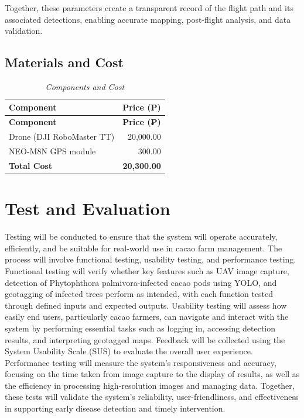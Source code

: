 Together, these parameters create a transparent record of the flight path and its associated detections, enabling accurate mapping, post-flight analysis, and data validation.

\subsection{Materials and Cost}

\begin{longtable}{p{8cm} r}
	\caption{\textit{Components and Cost}} \label{tab:components} \\

	\toprule
	\textbf{Component}        & \textbf{Price (₱)}                \\
	\midrule
	\endfirsthead

	\toprule
	\textbf{Component}        & \textbf{Price (₱)}                \\
	\midrule
	\endhead

	\bottomrule
	\endfoot

	Drone (DJI RoboMaster TT) & 20,000.00                         \\
	NEO-M8N GPS module        & 300.00                            \\
	\midrule
	\textbf{Total Cost}       & \textbf{20,300.00}                \\
\end{longtable}


\section{Test and Evaluation}

Testing will be conducted to ensure that the system will operate accurately, efficiently, and be suitable for real-world use in cacao farm management. The process will involve functional testing, usability testing, and performance testing. Functional testing will verify whether key features such as UAV image capture, detection of Phytophthora palmivora-infected cacao pods using YOLO, and geotagging of infected trees perform as intended, with each function tested through defined inputs and expected outputs. Usability testing will assess how easily end users, particularly cacao farmers, can navigate and interact with the system by performing essential tasks such as logging in, accessing detection results, and interpreting geotagged maps. Feedback will be collected using the System Usability Scale (SUS) to evaluate the overall user experience. Performance testing will measure the system’s responsiveness and accuracy, focusing on the time taken from image capture to the display of results, as well as the efficiency in processing high-resolution images and managing data. Together, these tests will validate the system’s reliability, user-friendliness, and effectiveness in supporting early disease detection and timely intervention.

